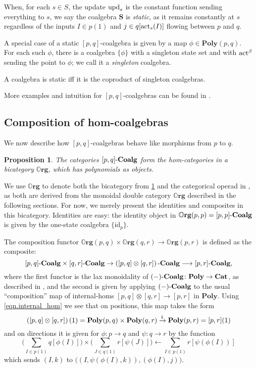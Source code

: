 \documentclass{eptcs}
\theoremstyle{definition}
\theoremstyle{plain}
\newtheorem{proposition}[definitionx]{Proposition}
\newenvironment{example}
  {\pushQED{\qed}\renewcommand{\qedsymbol}{$\lozenge$}\examplex}
  {\popQED\endexamplex}
\newcommand{\Cat}[1]{\textbf{#1}}%
\newcommand{\id}{\mathrm{id}}
\newcommand{\then}{\mathbin{\fatsemi}}
\newcommand{\too}{\longrightarrow}
\newcommand{\To}[2][]{\xrightarrow[#1]{#2}}
\newcommand{\from}{\leftarrow}
\newcommand{\tn}[1]{\textnormal{#1}}
\newcommand{\smcat}{\Cat{Cat}}
\newcommand{\act}{\tn{act}}
\newcommand{\upd}{\tn{upd}}
\newcommand{\poly}{\Cat{Poly}}
\newcommand{\0}{\textsf{0}}
\newcommand{\1}{\tn{\textsf{1}}}
\newcommand{\coalg}{\tn{-}\Cat{Coalg}}
\newcommand{\org}{{\mathbb{O}\Cat{rg}}}
\renewcommand{\S}{{\Cat{S}}}
\newcommand{\idcoalg}[1]{{\{\id_{#1}\}}}
\begin{document}
When, for each $s \in S$, the update $\upd_s$ is the constant function sending everything to $s$, we say the coalgebra $\S$ is \emph{static}, as it remains constantly at $s$ regardless of the inputs $I \in p(1)$ and $j\in q[\act_s(I)]$ flowing between $p$ and $q$.

\begin{example}\label{ex.single_state}
A special case of a static $[p,q]$-coalgebra is given by a map $\phi \in \poly(p,q)$. For each such $\phi$, there is a coalgebra $\{\phi\}$ with a singleton state set and with $\act^\beta$ sending the point to $\phi$; we call it a \emph{singleton} coalgebra. 

A coalgebra is static iff it is the coproduct of singleton coalgebras.
\end{example}

More examples and intuition for $[p,q]$-coalgebras can be found in \cite{spivak2021learners}.


\subsection{Composition of hom-coalgebras}\label{sec.compose_hom_coalg}



We now describe how $[p,q]$-coalgebras behave like morphisms from $p$ to $q$.

\begin{proposition}\label{prop.def_org}
The categories $[p,q]\coalg$ form the hom-categories in a bicategory $\org$, which has polynomials as objects.
\end{proposition}

We use $\org$ to denote both the bicategory from \cref{prop.def_org} and the categorical operad in \cite[Definition 2.19]{spivak2021learners}, as both are derived from the monoidal double category $\org$ described in the following sections. For now, we merely present the identities and composites in this bicategory. Identities are easy: the identity object in $\org(p,p)=[p,p]\coalg$ is given by the one-state coalgebra $\idcoalg{p}$. 

The composition functor $\org(p,q)\times\org(q,r)\too\org(p,r)$ is defined as the composite:
\[[p,q]\coalg \times [q,r]\coalg \to \left([p,q] \otimes [q,r]\right)\coalg \too [p,r]\coalg,\]
where the first functor is the lax monoidality of $(-)\coalg\colon\poly \to \smcat$, as described in \cite[Proposition 2.13]{spivak2021learners}, and the second is given by applying $(-)\coalg$ to the usual ``composition'' map of internal-homs $[p,q] \otimes [q,r] \to [p,r]$ in $\poly$. Using \eqref{eqn.internal_hom} we see that on positions, this map takes the form\vspace{-.1cm}
\[\left([p,q] \otimes [q,r]\right)(1) = \poly(p,q) \times \poly(q,r) \To{\then} \poly(p,r) = [p,r](1)\]
and on directions it is given for $\phi\colon p \to q$ and $\psi\colon q \to r$ by the function
\[\bigg(\sum_{I \in p(1)} q[\phi(I)]\bigg) \times \bigg(\sum_{J \in q(1)} r[\psi(J)]\bigg) \from \sum_{I \in p(1)} r[\psi(\phi(I))]\]
which sends $(I,k)$ to $\big((I,\psi(\phi(I),k)),(\phi(I),j)\big)$. 
\end{document}
